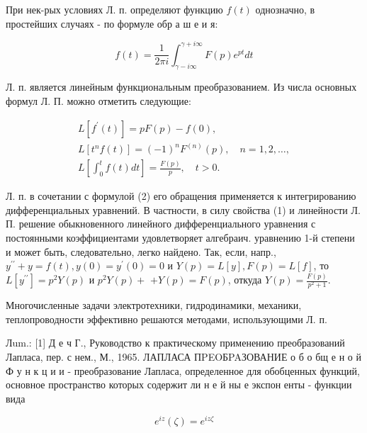 \documentclass[10pt]{article}
\begin{document}
При нек-рых условиях Л. п. определяют функцию $f(t)$ однозначно, в простейших случаях - по формуле обр а ш е и я:



\[

f(t)=\frac{1}{2 \pi i} \int_{\gamma-i \infty}^{\gamma+i \infty} F(p) e^{p t} d t

\]



Л. п. является линейным функциональным преобразованием. Из числа основных формул Л. П. можно отметить следующие:



\[

\begin{gathered}

L\left[f^{\prime}(t)\right]=p F(p)-f(0), \\

L\left[t^{n} f(t)\right]=(-1)^{n} F^{(n)}(p), \quad n=1,2, \ldots, \\

L\left[\int_{0}^{t} f(t) d t\right]=\frac{F(p)}{p}, \quad t>0 .

\end{gathered}

\]



Л. п. в сочетании с формулой (2) его обращения применяется к интегрированию дифференциальных уравнений. В частности, в силу свойства (1) и линейности Л. П. решение обыкновенного линейного дифференциального уравнения с постоянными коэффициентами удовлетворяет алгебраич. уравнению 1-й степени и может быть, следовательно, легко найдено. Так, если, напр., $y^{\prime \prime}+y=f(t), y(0)=y^{\prime}(0)=0$ и $Y(p)=L[y], F(p)=L[f]$, то $L\left[y^{\prime \prime}\right]=p^{2} Y(p)$ и $p^{2} Y(p)+$ $+Y(p)=F(p)$, откуда $Y(p)=\frac{F(p)}{p^{2}+1}$.



Многочисленные задачи электротехники, гидродинамики, механики, теплопроводности эффективно решаются методами, использующими Л. п.



Лum.: [1] Д е ч Г., Руководство к практическому применению преобразований Лапласа, пер. с нем., М., 1965. ЛАПЛАСА ПPEOБPAЗОВАНИЕ о б о бщ е н о й Ф у н к ц и и - преобразование Лапласа, определенное для обобценных функций, основное пространство которых содержит ли н е й ны е экспон енты - функции вида



\[

e^{i z}(\zeta)=e^{i z \zeta}

\]
\end{document}
